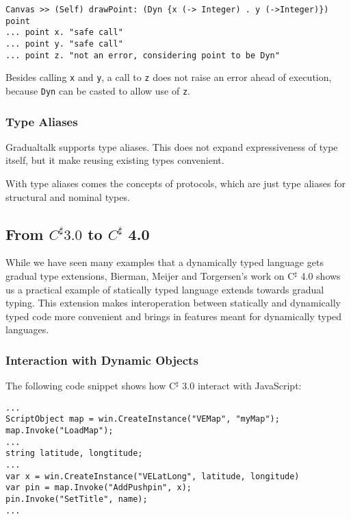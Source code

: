 \begin{verbatim}
Canvas >> (Self) drawPoint: (Dyn {x (-> Integer) . y (->Integer)}) point
... point x. "safe call"
... point y. "safe call"
... point z. "not an error, considering point to be Dyn"
\end{verbatim}

Besides calling \texttt{x} and \texttt{y}, a call to \texttt{z} does not
raise an error ahead of execution, because \texttt{Dyn} can be casted to allow use of
\texttt{z}.

\subsubsection{Type Aliases}

Gradualtalk supports type aliases. This does not expand expressiveness of type itself,
but it make reusing existing types convenient.

With type aliases comes the concepts of protocols, which are just type aliases
for structural and nominal types.

\newcommand{\csharp}{C^\sharp}
\subsection{From $\csharp 3.0$ to $\csharp$ 4.0}

While we have seen many examples that a dynamically typed language gets
gradual type extensions, Bierman, Meijer and Torgersen's work on
C$^\sharp$ 4.0 shows us a practical example of statically typed language
extends towards gradual typing.
This extension makes interoperation between statically and dynamically typed code
more convenient and brings in features meant for dynamically typed languages.

\subsubsection{Interaction with Dynamic Objects}

The following code snippet shows how C$^\sharp$ 3.0 interact with JavaScript:

\begin{verbatim}
...
ScriptObject map = win.CreateInstance("VEMap", "myMap");
map.Invoke("LoadMap");
...
string latitude, longtitude;
...
var x = win.CreateInstance("VELatLong", latitude, longitude)
var pin = map.Invoke("AddPushpin", x);
pin.Invoke("SetTitle", name);
...
\end{verbatim}

